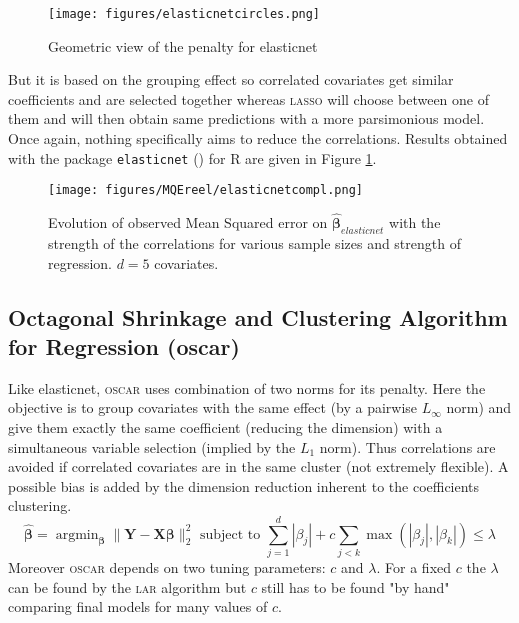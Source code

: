 \documentclass[12pt,a4paper]{report}
\begin{document}
	
	\begin{figure}[h!]
			\centering
			\texttt{[image: figures/elasticnetcircles.png]} 
			\caption{Geometric view of the penalty for elasticnet}
		\end{figure}	
	
	But it is based on the grouping effect so correlated covariates get similar coefficients and are selected together whereas \textsc{lasso} will choose between one of them and will then obtain same predictions with a more parsimonious model. Once again, nothing specifically aims to reduce the correlations. Results obtained with the package {\tt elasticnet} (\cite{packageelasticnet}) for R are given in Figure \ref{MQEelasticnetcompl}.

	
	 \begin{figure}
	 \centering
	  \texttt{[image: figures/MQEreel/elasticnetcompl.png]}
	  \caption{Evolution of observed Mean Squared error on $\hat{\boldsymbol{\beta}}_{elasticnet}$ with the strength of the correlations for various sample sizes and strength of regression. $d=5$ covariates. } \label{MQEelasticnetcompl}
	\end{figure}
		
		 \FloatBarrier

		\subsection{Octagonal Shrinkage and Clustering Algorithm for Regression ({\sc oscar})}		%

			Like elasticnet, \textsc{oscar} \cite{bondell2008simultaneous} uses combination of two norms for its penalty. Here the objective is to group covariates with the same effect (by a pairwise $L_\infty$ norm) and give them exactly the same coefficient (reducing the dimension) with a simultaneous variable selection (implied by the $L_1$ norm). Thus correlations are avoided if correlated covariates are in the same cluster (not extremely flexible). A possible bias is added by the dimension reduction inherent to the coefficients clustering.
			\begin{equation}
				\hat{\boldsymbol{\beta}}=\operatorname{argmin}_{\boldsymbol{\beta}} \parallel\boldsymbol{Y}-\boldsymbol{X}\boldsymbol{\beta} \parallel^2_2 \textrm{ subject to } \sum_{j=1}^d|\beta_j|+c\sum_{j<k}\operatorname{max}(|\beta_j|,|\beta_k|) \leq \lambda		 \nonumber 
			\end{equation}						
			Moreover \textsc{oscar} depends on two tuning parameters: $c$ and $\lambda$. For a fixed $c$ the $\lambda$ can be found by the \textsc{lar} algorithm but $c$ still has to be found "by hand" comparing final models for many values of $c$.
			
\end{document}
